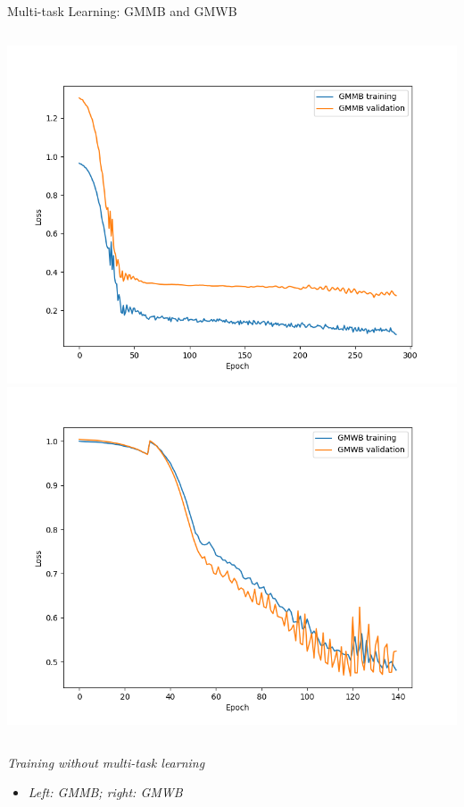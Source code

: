     \begin{frame}{Multi-task Learning: GMMB and GMWB}
    \begin{columns}
    \includegraphics[height=0.8\textheight]{../project3/figures/figure5c.png}
    \includegraphics[height=0.8\textheight]{../project3/figures/figure5d.png}
    \end{columns}
    
    \textit{Training without multi-task learning}
    \begin{itemize}
        \item \textit{Left: GMMB; right: GMWB}
    \end{itemize}
    \end{frame}
    
